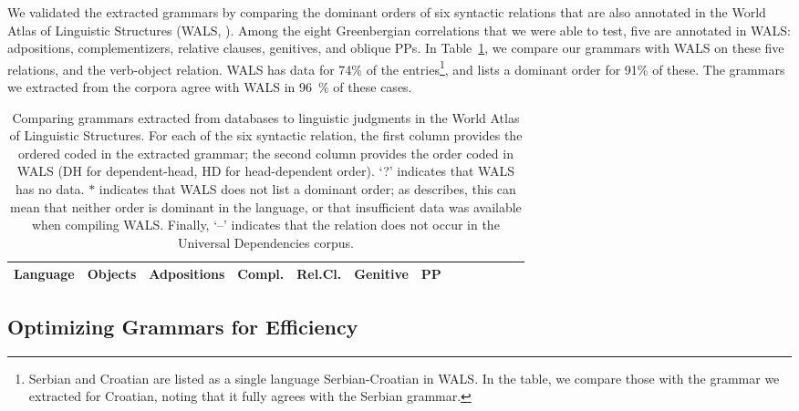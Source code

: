 \documentclass[10pt,twoside,lineno]{article}
\begin{document}
We validated the extracted grammars by comparing the dominant orders of six syntactic relations that are also annotated in the World Atlas of Linguistic Structures (WALS, \cite{haspelmath2005world}).
Among the eight Greenbergian correlations that we were able to test, five are annotated in WALS: adpositions, complementizers, relative clauses, genitives, and oblique PPs.
In Table~\ref{tab:grammars-wals}, we compare our grammars with WALS on these five relations, and the verb-object relation.
WALS has data for 74\% of the entries\footnote{Serbian and Croatian are listed as a single language Serbian-Croatian in WALS. In the table, we compare those with the grammar we extracted for Croatian, noting that it fully agrees with the Serbian grammar.}, and lists a dominant order for 91\% of these.
The grammars we extracted from the corpora agree with WALS in 96~\%  of these cases.




\begin{table}
\small{
\begin{center}
\begin{tabular}{l||ll|ll|ll|ll|ll|ll|llllll}
		   Language 
		   &	\multicolumn{2}{c|}{Objects} 
		   &	\multicolumn{2}{c|}{Adpositions} 
		   &	\multicolumn{2}{c|}{Compl.} 
		   &	\multicolumn{2}{c|}{Rel.Cl.} 
		   &	\multicolumn{2}{c|}{Genitive} 
		   &	\multicolumn{2}{c|}{PP}  \\ \hline\hline
	
\end{tabular}
\end{center}
}
\caption{Comparing grammars extracted from databases to linguistic judgments in the World Atlas of Linguistic Structures. For each of the six syntactic relation, the first column provides the ordered coded in the extracted grammar; the second column provides the order coded in WALS (DH for dependent-head, HD for head-dependent order). `?' indicates that WALS has no data.
$*$ indicates that WALS does not list a dominant order; as \citet{dryer2011evidence} describes, this can mean that neither order is dominant in the language, or that insufficient data was available when compiling WALS.
Finally, `--' indicates that the relation does not occur in the Universal Dependencies corpus.
}\label{tab:grammars-wals}
\end{table}




\subsection{Optimizing Grammars for Efficiency}\label{sec:optim-eff}
\end{document}
